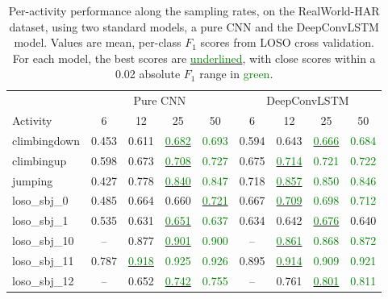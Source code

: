 \begin{table}[t]
  \centering\scriptsize
  \caption{Per-activity performance along the sampling rates, on the RealWorld-HAR dataset, using two standard models, a pure CNN and the DeepConvLSTM model. Values are mean, per-class $F_1$ scores from LOSO cross validation. For each model, the best scores are \underline{\textcolor{green}{underlined}}, with close scores within a 0.02 absolute $F_1$ range in \textcolor{green}{green}.}
  \label{tab:freq_perclass_rwhar_combined}
  \begin{tabularx}{\linewidth}{@{}>{\raggedright\arraybackslash}X cccc @{\hspace{1.5em}} cccc@{}}
    \toprule
    & \multicolumn{4}{c}{Pure CNN} & \multicolumn{4}{c}{DeepConvLSTM} \\
    Activity & 6 & 12 & 25 & 50 & 6 & 12 & 25 & 50 \\
    \midrule
    climbingdown & 0.453 & 0.611 & \underline{\textcolor{green}{0.682}} & \textcolor{green}{0.693} & 0.594 & 0.643 & \underline{\textcolor{green}{0.666}} & \textcolor{green}{0.684} \\
    climbingup & 0.598 & 0.673 & \underline{\textcolor{green}{0.708}} & \textcolor{green}{0.727} & 0.675 & \underline{\textcolor{green}{0.714}} & \textcolor{green}{0.721} & \textcolor{green}{0.722} \\
    jumping & 0.427 & 0.778 & \underline{\textcolor{green}{0.840}} & \textcolor{green}{0.847} & 0.718 & \underline{\textcolor{green}{0.857}} & \textcolor{green}{0.850} & \textcolor{green}{0.846} \\
    loso_sbj_0 & 0.485 & 0.664 & 0.660 & \underline{\textcolor{green}{0.721}} & 0.667 & \underline{\textcolor{green}{0.709}} & \textcolor{green}{0.698} & \textcolor{green}{0.712} \\
    loso_sbj_1 & 0.535 & 0.631 & \underline{\textcolor{green}{0.651}} & \textcolor{green}{0.637} & 0.634 & 0.642 & \underline{\textcolor{green}{0.676}} & 0.640 \\
    loso_sbj_10 & -- & 0.877 & \underline{\textcolor{green}{0.901}} & \textcolor{green}{0.900} & -- & \underline{\textcolor{green}{0.861}} & \textcolor{green}{0.868} & \textcolor{green}{0.872} \\
    loso_sbj_11 & 0.787 & \underline{\textcolor{green}{0.918}} & \textcolor{green}{0.925} & \textcolor{green}{0.926} & 0.895 & \underline{\textcolor{green}{0.914}} & \textcolor{green}{0.909} & \textcolor{green}{0.921} \\
    loso_sbj_12 & -- & 0.652 & \underline{\textcolor{green}{0.742}} & \textcolor{green}{0.755} & -- & 0.761 & \underline{\textcolor{green}{0.801}} & \textcolor{green}{0.811} \\

\end{tabularx}
\end{table}
